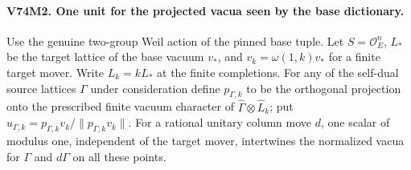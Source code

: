 \paragraph{V74M2. One unit for the projected vacua seen by the base dictionary.}
\label{claim:V74M2}
Use the genuine two-group Weil action of the pinned base tuple.
Let $S=\mathcal O_E^n$, $L_*$ be the target lattice of the base
vacuum $v_*$, and $v_k=\omega(1,k)v_*$ for a finite target mover.
Write $L_k=kL_*$ at the finite completions. For any of the self-dual
source lattices $\Gamma$ under consideration define $p_{\Gamma,k}$
to be the orthogonal projection onto the prescribed finite vacuum
character of $\widehat\Gamma\otimes\widehat L_k$; put
$u_{\Gamma,k}=p_{\Gamma,k}v_k/\|p_{\Gamma,k}v_k\|$.
For a rational unitary column move $d$, one scalar of modulus one,
independent of the target mover, intertwines the normalized vacua
for $\Gamma$ and $d\Gamma$ on all these points.

